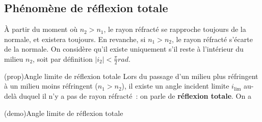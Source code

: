 \documentclass[../../main/main.tex]{subfiles}
\begin{document}
\subsection{Phénomène de réflexion totale}

À partir du moment où $n_2 > n_1$, le rayon réfracté se rapproche toujours de la
normale, et existera toujours. En revanche, si $n_1 > n_2$, le rayon réfracté
s'écarte de la normale. On considère qu'il existe uniquement s'il reste à
l'intérieur du milieu $n_2$, soit par définition $|i_2| <
	\frac{\pi}{2}\si{rad}$.

\begin{tcb*}[label=prop:ilim](prop){Angle limite de réflexion totale}
	Lors du passage d'un milieu plus réfringent à un milieu moins réfringent
	($n_1 > n_2$), il existe un angle incident limite $i_{\lim}$ au-delà
	duquel il n'y a pas de rayon réfracté~: on parle de \textbf{réflexion
		totale}. On a
	\psw{%
	\[
		\boxed{|i_{\lim}| = \arcsin \left( \frac{n_2}{n_1} \right)}
	\]
	}%
\end{tcb*}
\begin{tcb*}[label=demo:ilim](demo){Angle limite de
			réflexion totale}
\end{tcb*}
\end{document}
